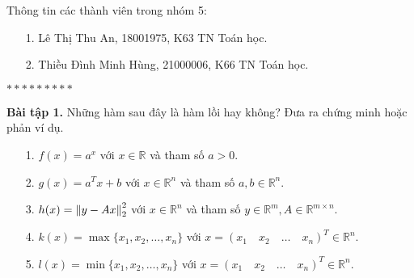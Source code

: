\documentclass[12pt]{article}
\newcommand{\R}{\mathbb{R}}
\begin{document}
    Thông tin các thành viên trong nhóm 5:
    \begin{enumerate}
        \item[1.] Lê Thị Thu An, 18001975, K63 TN Toán học.
        \item[2.] Thiều Đình Minh Hùng, 21000006, K66 TN Toán học.
    \end{enumerate}
    \begin{center}
        $*********$
    \end{center}
    \textbf{Bài tập 1.} Những hàm sau đây là hàm lồi hay không? Đưa ra chứng minh hoặc phản ví dụ.
    \begin{enumerate}
        \item[1.] $f(x) = a^x$ với $x \in \R$ và tham số $a > 0$.
        \item[2.] $g(x) = a^{T}x + b$ với $x \in \R^n$ và tham số $a, b \in \R^n$.
        \item[3.] $h(x) = \norm{y - Ax}_2^2$ với $x \in \R^n$ và tham số $y \in \R^m, A \in \R^{m \times n}$.
        \item[4.] $k(x) = \max\{x_1, x_2, \dots, x_n\}$ với $x = (x_1 \quad x_2 \quad \ldots \quad x_n)^T \in \R^n$.
        \item[5.] $l(x) = \min\{x_1, x_2, \dots, x_n\}$ với $x = (x_1 \quad x_2 \quad \ldots \quad x_n)^T \in \R^n$.
    \end{enumerate}
\end{document}
